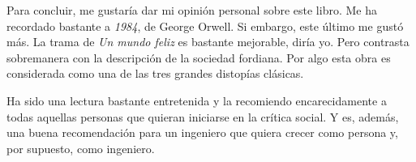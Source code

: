 \documentclass{article}
\begin{document}
Para concluir, me gustaría dar mi opinión personal sobre este libro. Me ha recordado bastante a \textit{1984}, de George Orwell. Si embargo, este último me gustó más. La trama de \textit{Un mundo feliz} es bastante mejorable, diría yo. Pero contrasta sobremanera con la descripción de la sociedad fordiana. Por algo esta obra es considerada como una de las tres grandes distopías clásicas.

Ha sido una lectura bastante entretenida y la recomiendo encarecidamente a todas aquellas personas que quieran iniciarse en la crítica social. Y es, además, una buena recomendación para un ingeniero que quiera crecer como persona y, por supuesto, como ingeniero.
\end{document}
